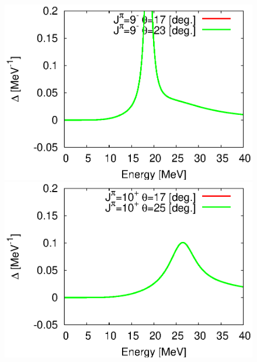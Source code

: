 \documentclass[english,a4paper]{jsarticle}
\begin{document}
\begin{figure}
  \begin{minipage}{0.5\textwidth}
    \includegraphics[width=1.0\textwidth,clip]{../cld_j9_n60_b0.11_g1.17_th17^23.eps}
  \end{minipage}
  \begin{minipage}{0.5\textwidth}
    \includegraphics[width=1.0\textwidth,clip]{../cld_j10_n60_b0.11_g1.17_th17^25.eps}
  \end{minipage}
\end{figure}
\end{document}
